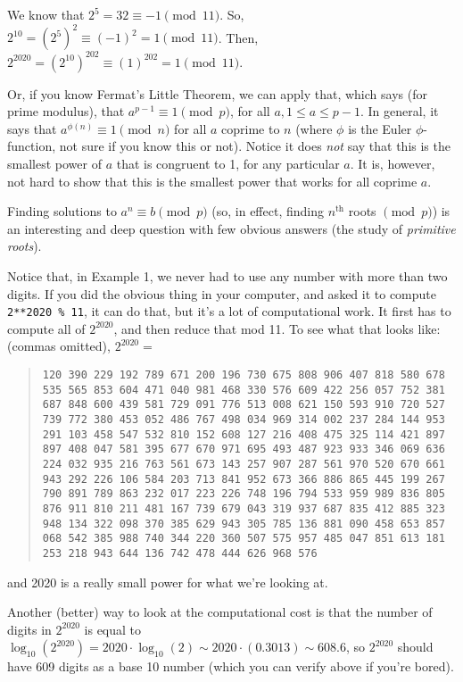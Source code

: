 \documentclass[12pt]{article}
\begin{document}
We know that $2^5 = 32 \equiv -1 \pmod{11}$.  So, $2^{10} = \left(2^5\right)^2 \equiv (-1)^2 = 1 \pmod{11}$.  Then, $2^{2020} = \left(2^{10}\right)^{202} \equiv (1)^{202} = 1 \pmod{11}$.

Or, if you know Fermat's Little Theorem, we can apply that, which says (for prime modulus), that $a^{p-1} \equiv 1 \pmod{p}$, for all $a, 1 \leq a \leq p-1$.  In general, it says that $a^{\phi(n)} \equiv 1 \pmod{n}$ for all $a$ coprime to $n$ (where $\phi$ is the Euler $\phi$-function, not sure if you know this or not).  Notice it does \emph{not} say that this is the smallest power of $a$ that is congruent to 1, for any particular $a$.  It is, however, not hard to show that this is the smallest power that works for all coprime $a$.

Finding solutions to $a^n \equiv b \pmod{p}$ (so, in effect, finding $n^{\text{th}}$ roots $\pmod{p}$) is an interesting and deep question with few obvious answers (the study of \emph{primitive roots}).

Notice that, in Example 1, we never had to use any number with more than two digits.  If you did the obvious thing in your computer, and asked it to compute \texttt{2**2020 \% 11}, it can do that, but it's a lot of computational work.  It first has to compute all of $2^{2020}$, and then reduce that mod 11.  To see what that looks like: (commas omitted), $2^{2020} =$ 

\begin{quote} 
\texttt{120 390 229 192 789 671 200 196 730 675 808 906 407 818 580 678 535 565 853 604 471 040 981 468 330 576 609 422 256 057 752 381 687 848 600 439 581 729 091 776 513 008 621 150 593 910 720 527 739 772 380 453 052 486 767 498 034 969 314 002 237 284 144 953 291 103 458 547 532 810 152 608 127 216 408 475 325 114 421 897 897 408 047 581 395 677 670 971 695 493 487 923 933 346 069 636 224 032 935 216 763 561 673 143 257 907 287 561 970 520 670 661 943 292 226 106 584 203 713 841 952 673 366 886 865 445 199 267 790 891 789 863 232 017 223 226 748 196 794 533 959 989 836 805 876 911 810 211 481 167 739 679 043 319 937 687 835 412 885 323 948 134 322 098 370 385 629 943 305 785 136 881 090 458 653 857 068 542 385 988 740 344 220 360 507 575 957 485 047 851 613 181 253 218 943 644 136 742 478 444 626 968 576
} \end{quote}

and 2020 is a really small power for what we're looking at.

Another (better) way to look at the computational cost is that the number of digits in $2^{2020}$ is equal to $\log_{10}(2^{2020}) = 2020 \cdot \log_{10}(2) \sim 2020 \cdot (0.3013) \sim 608.6$, so $2^{2020}$ should have 609 digits as a base 10 number (which you can verify above if you're bored).
\end{document}
